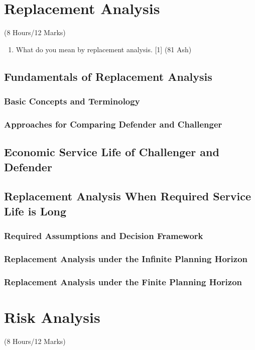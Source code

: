 \documentclass[12pt]{article}
\begin{document}
	\pagebreak
\section{Replacement Analysis}
	\begin{center}(8 Hours/12 Marks)\end{center}
	\begin{enumerate}[noitemsep, topsep = 0pt]
		\item What do you mean by replacement analysis. \hfill [1] (81 Ash)
	\end{enumerate}
	\subsection{Fundamentals of Replacement Analysis}
	\subsubsection{Basic Concepts and Terminology}
	\subsubsection{Approaches for Comparing Defender and Challenger}
	\subsection{Economic Service Life of Challenger and Defender}
	\subsection{Replacement Analysis When Required Service Life is Long}
	\subsubsection{Required Assumptions and Decision Framework}
	\subsubsection{Replacement Analysis under the Infinite Planning Horizon}
	\subsubsection{Replacement Analysis under the Finite Planning Horizon}

	\pagebreak
\section{Risk Analysis}
	\begin{center}(8 Hours/12 Marks)\end{center}
\end{document}
